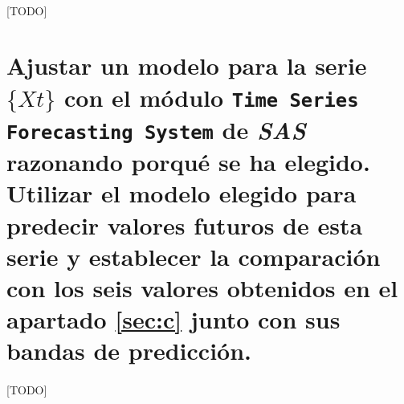 \documentclass[a4paper, spanish]{article}
\begin{document}
    \paragraph{}
    [TODO]


  \section{Ajustar un modelo para la serie $\{ Xt \}$ con el módulo \texttt{Time Series Forecasting System} de \emph{SAS} razonando porqué se ha elegido. Utilizar el modelo elegido para predecir valores futuros de esta serie y establecer la comparación con los seis valores obtenidos en el apartado \ref{sec:c} junto con sus bandas de predicción.}
  \label{sec:f}

    \paragraph{}
    [TODO]
\end{document}
